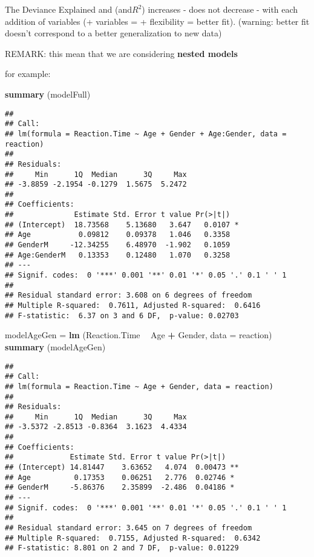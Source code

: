 \documentclass[
]{article}
\newenvironment{Shaded}{\begin{snugshade}}{\end{snugshade}}
\newcommand{\DataTypeTok}[1]{\textcolor[rgb]{0.13,0.29,0.53}{#1}}
\newcommand{\KeywordTok}[1]{\textcolor[rgb]{0.13,0.29,0.53}{\textbf{#1}}}
\newcommand{\NormalTok}[1]{#1}
\newcommand{\OperatorTok}[1]{\textcolor[rgb]{0.81,0.36,0.00}{\textbf{#1}}}
\newcommand{\StringTok}[1]{\textcolor[rgb]{0.31,0.60,0.02}{#1}}
\begin{document}
The Deviance Explained and (and\(R ^ 2\)) increases - does not decrease
- with each addition of variables (+ variables = + flexibility = better
fit). (warning: better fit doesn't correspond to a better generalization
to new data)

REMARK: this mean that we are considering \textbf{nested models}

for example:

\begin{Shaded}
\begin{Highlighting}[]
\KeywordTok{summary}\NormalTok{ (modelFull)}
\end{Highlighting}
\end{Shaded}

\begin{verbatim}
## 
## Call:
## lm(formula = Reaction.Time ~ Age + Gender + Age:Gender, data = reaction)
## 
## Residuals:
##     Min      1Q  Median      3Q     Max 
## -3.8859 -2.1954 -0.1279  1.5675  5.2472 
## 
## Coefficients:
##              Estimate Std. Error t value Pr(>|t|)  
## (Intercept)  18.73568    5.13680   3.647   0.0107 *
## Age           0.09812    0.09378   1.046   0.3358  
## GenderM     -12.34255    6.48970  -1.902   0.1059  
## Age:GenderM   0.13353    0.12480   1.070   0.3258  
## ---
## Signif. codes:  0 '***' 0.001 '**' 0.01 '*' 0.05 '.' 0.1 ' ' 1
## 
## Residual standard error: 3.608 on 6 degrees of freedom
## Multiple R-squared:  0.7611, Adjusted R-squared:  0.6416 
## F-statistic:  6.37 on 3 and 6 DF,  p-value: 0.02703
\end{verbatim}

\begin{Shaded}
\begin{Highlighting}[]
\NormalTok{modelAgeGen =}\StringTok{ }\KeywordTok{lm}\NormalTok{ (Reaction.Time }\OperatorTok{~}\StringTok{ }\NormalTok{Age }\OperatorTok{+}\StringTok{ }\NormalTok{Gender, }\DataTypeTok{data =}\NormalTok{ reaction)}
\KeywordTok{summary}\NormalTok{ (modelAgeGen)}
\end{Highlighting}
\end{Shaded}

\begin{verbatim}
## 
## Call:
## lm(formula = Reaction.Time ~ Age + Gender, data = reaction)
## 
## Residuals:
##     Min      1Q  Median      3Q     Max 
## -3.5372 -2.8513 -0.8364  3.1623  4.4334 
## 
## Coefficients:
##             Estimate Std. Error t value Pr(>|t|)   
## (Intercept) 14.81447    3.63652   4.074  0.00473 **
## Age          0.17353    0.06251   2.776  0.02746 * 
## GenderM     -5.86376    2.35899  -2.486  0.04186 * 
## ---
## Signif. codes:  0 '***' 0.001 '**' 0.01 '*' 0.05 '.' 0.1 ' ' 1
## 
## Residual standard error: 3.645 on 7 degrees of freedom
## Multiple R-squared:  0.7155, Adjusted R-squared:  0.6342 
## F-statistic: 8.801 on 2 and 7 DF,  p-value: 0.01229
\end{verbatim}
\end{document}
